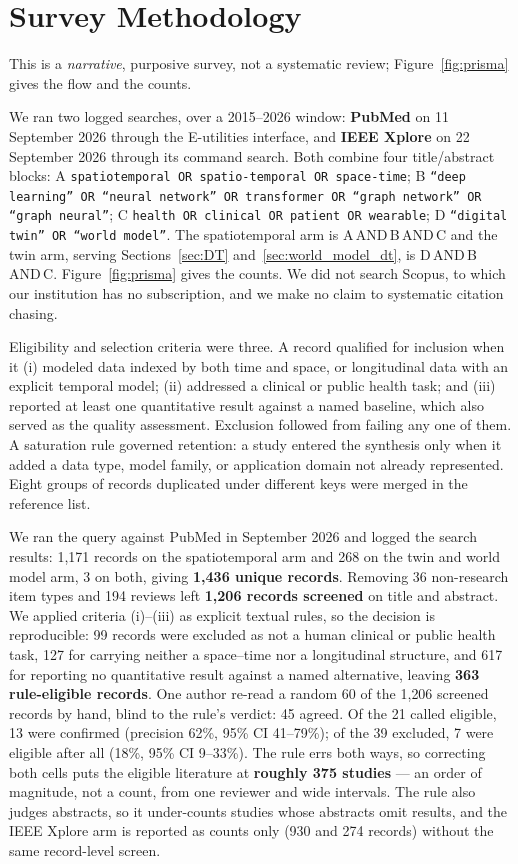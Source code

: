 \documentclass[journal]{IEEEtran}
\begin{document}
\fi


\section{Survey Methodology}
\label{sec:method}
This is a \emph{narrative}, purposive survey, not a systematic review; Figure~\ref{fig:prisma} gives the flow and the counts.

We ran two logged searches, over a 2015--2026 window: \textbf{PubMed} on 11 September 2026 through the E-utilities interface, and \textbf{IEEE Xplore} on 22 September 2026 through its command search. Both combine four title/abstract blocks: A \texttt{spatiotemporal OR spatio-temporal OR space-time}; B \texttt{``deep learning'' OR ``neural network'' OR transformer OR ``graph network'' OR ``graph neural''}; C \texttt{health OR clinical OR patient OR wearable}; D \texttt{``digital twin'' OR ``world model''}. The spatiotemporal arm is A\,AND\,B\,AND\,C and the twin arm, serving Sections~\ref{sec:DT} and~\ref{sec:world_model_dt}, is D\,AND\,B\,AND\,C. Figure~\ref{fig:prisma} gives the counts. We did not search Scopus, to which our institution has no subscription, and we make no claim to systematic citation chasing.

Eligibility and selection criteria were three. A record qualified for inclusion when it (i) modeled data indexed by both time and space, or longitudinal data with an explicit temporal model; (ii) addressed a clinical or public health task; and (iii) reported at least one quantitative result against a named baseline, which also served as the quality assessment. Exclusion followed from failing any one of them. A saturation rule governed retention: a study entered the synthesis only when it added a data type, model family, or application domain not already represented. Eight groups of records duplicated under different keys were merged in the reference list.

We ran the query against PubMed in September 2026 and logged the search results: 1{,}171 records on the spatiotemporal arm and 268 on the twin and world model arm, 3 on both, giving \textbf{1{,}436 unique records}. Removing 36 non-research item types and 194 reviews left \textbf{1{,}206 records screened} on title and abstract. We applied criteria (i)--(iii) as explicit textual rules, so the decision is reproducible: 99 records were excluded as not a human clinical or public health task, 127 for carrying neither a space--time nor a longitudinal structure, and 617 for reporting no quantitative result against a named alternative, leaving \textbf{363 rule-eligible records}. One author re-read a random 60 of the 1{,}206 screened records by hand, blind to the rule's verdict: 45 agreed. Of the 21 called eligible, 13 were confirmed (precision 62\%, 95\% CI 41--79\%); of the 39 excluded, 7 were eligible after all (18\%, 95\% CI 9--33\%). The rule errs both ways, so correcting both cells puts the eligible literature at \textbf{roughly 375 studies} --- an order of magnitude, not a count, from one reviewer and wide intervals. The rule also judges abstracts, so it under-counts studies whose abstracts omit results, and the IEEE Xplore arm is reported as counts only (930 and 274 records) without the same record-level screen.
\end{document}
